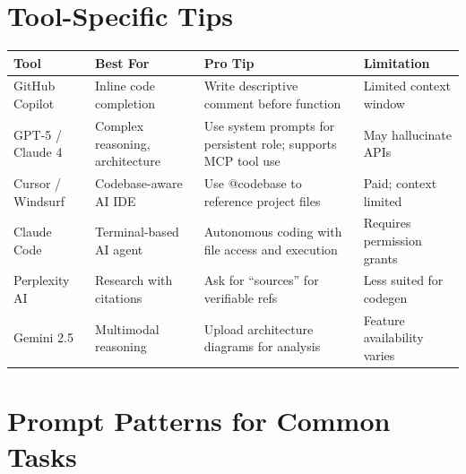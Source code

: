 \documentclass[11pt, a4paper, oneside]{report}
\begin{document}
\section[Tool Tips]{Tool-Specific Tips}

{\small
{}
\begin{longtable}{L{0.14\textwidth} L{0.24\textwidth} L{0.27\textwidth} L{0.25\textwidth}}
\toprule
\textbf{Tool} & \textbf{Best For} & \textbf{Pro Tip} & \textbf{Limitation} \\
\midrule
\endfirsthead
\bottomrule
\endlastfoot
GitHub Copilot & Inline code completion & Write descriptive comment before function & Limited context window \\
GPT-5 / Claude 4 & Complex reasoning, architecture & Use system prompts for persistent role; supports MCP tool use & May hallucinate APIs \\
Cursor / Windsurf & Codebase-aware AI IDE & Use @codebase to reference project files & Paid; context limited \\
Claude Code & Terminal-based AI agent & Autonomous coding with file access and execution & Requires permission grants \\
Perplexity AI & Research with citations & Ask for ``sources'' for verifiable refs & Less suited for codegen \\
Gemini 2.5 & Multimodal reasoning & Upload architecture diagrams for analysis & Feature availability varies \\
\end{longtable}

\section[Prompt Patterns]{Prompt Patterns for Common Tasks}

}
\end{document}
